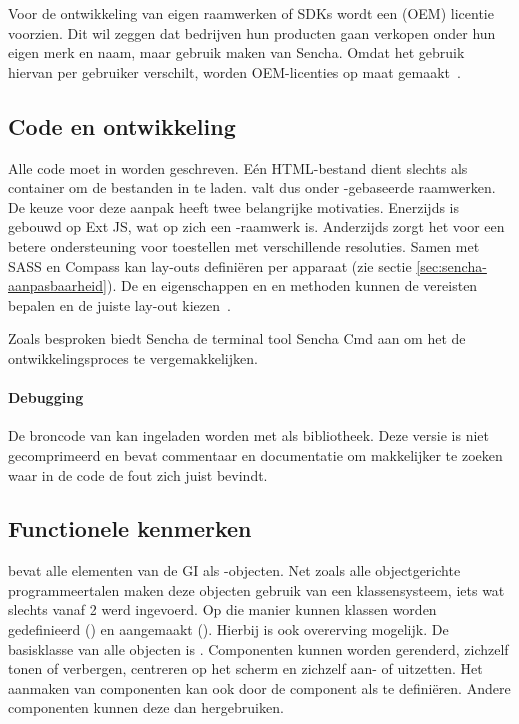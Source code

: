 Voor de ontwikkeling van eigen raamwerken of SDKs wordt een  (OEM) licentie voorzien.  
Dit wil zeggen dat bedrijven hun producten gaan verkopen onder hun eigen merk en naam, maar gebruik maken van Sencha.  
Omdat het gebruik hiervan per gebruiker verschilt,  worden OEM-licenties op maat gemaakt~\cite{Inc.}.

\subsection{Code en ontwikkeling}
Alle code moet in \js{} worden geschreven.
Eén HTML-bestand dient slechts als container om de bestanden in te laden.  
\st{} valt dus onder \js{}-gebaseerde raamwerken.  
De keuze voor deze aanpak heeft twee belangrijke motivaties.  
Enerzijds is \st{} gebouwd op Ext JS,  wat op zich een \js{}-raamwerk is.  
Anderzijds zorgt het voor een betere ondersteuning voor toestellen met verschillende resoluties.  
Samen met SASS en Compass kan \st{} lay-outs definiëren per apparaat (zie sectie \ref{sec:sencha-aanpasbaarheid}).  
De  en  eigenschappen en  en  methoden kunnen de vereisten bepalen en de juiste lay-out kiezen~\cite{JohnEClark2012}.

Zoals besproken biedt Sencha de terminal tool Sencha Cmd aan om het de ontwikkelingsproces te vergemakkelijken.  

\paragraph{Debugging}
De broncode van \st{} kan ingeladen worden met  als bibliotheek.  
Deze versie is niet gecomprimeerd en bevat commentaar en documentatie om makkelijker te zoeken waar in de code de fout zich juist bevindt.

\subsection{Functionele kenmerken}
\st{} bevat alle elementen van de GI als \js{}-objecten.  
Net zoals alle objectgerichte programmeertalen maken deze objecten gebruik van een klassensysteem,  iets wat slechts vanaf \st{} 2 werd ingevoerd.  
Op die manier kunnen klassen worden gedefinieerd () en aangemaakt ().  
Hierbij is ook overerving mogelijk.  
De basisklasse van alle objecten is .  
Componenten kunnen worden gerenderd, zichzelf tonen of verbergen,  centreren op het scherm en zichzelf aan- of uitzetten.   
Het aanmaken van componenten kan ook door de component als  te definiëren.  
Andere componenten kunnen deze  dan hergebruiken.

